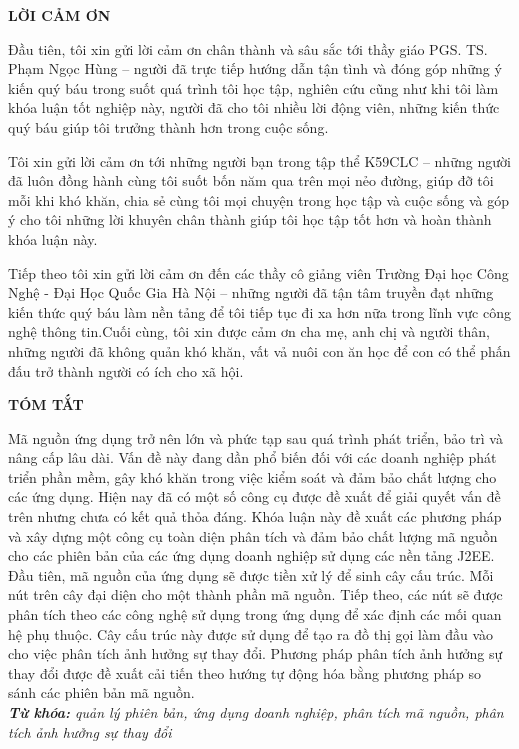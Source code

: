 \documentclass[12pt]{report}
\begin{document}
\newpage
\begin{titlepage}
\begin{center}
	\textbf{\large LỜI CẢM ƠN}
\end{center}
Đầu tiên, tôi xin gửi lời cảm ơn chân thành và sâu sắc tới thầy giáo PGS. TS. Phạm Ngọc Hùng – người đã trực tiếp hướng dẫn tận tình và đóng góp những ý kiến quý báu trong suốt quá trình tôi học tập, nghiên cứu cũng như khi tôi làm khóa luận tốt nghiệp này, người đã cho tôi nhiều lời động viên, những kiến thức quý báu giúp tôi trưởng thành hơn trong cuộc sống.

Tôi xin gửi lời cảm ơn tới những người bạn trong tập thể K59CLC – những người đã luôn đồng hành cùng tôi suốt bốn năm qua trên mọi nẻo đường, giúp đỡ tôi mỗi khi khó khăn, chia sẻ cùng tôi mọi chuyện trong học tập và cuộc sống và góp ý cho tôi những lời khuyên chân thành giúp tôi học tập tốt hơn và hoàn thành khóa luận này.

Tiếp theo tôi xin gửi lời cảm ơn đến các thầy cô giảng viên Trường Đại học Công Nghệ - Đại Học Quốc Gia Hà Nội – những người đã tận tâm truyền đạt những kiến thức quý báu làm nền tảng để tôi tiếp tục đi xa hơn nữa trong lĩnh vực công nghệ thông tin.Cuối cùng, tôi xin được cảm ơn cha mẹ, anh chị và người thân, những người đã không quản khó khăn, vất vả nuôi con ăn học để con có thể phấn đấu trở thành người có ích cho xã hội.
\end{titlepage}

	
\newpage
\begin{titlepage}
\begin{center}
	\textbf{\large TÓM TẮT}
\end{center}
Mã nguồn ứng dụng trở nên lớn và phức tạp sau quá trình phát triển, bảo trì và nâng cấp lâu dài. Vấn đề này đang dần phổ biến đối với các doanh nghiệp phát triển phần mềm, gây khó khăn trong việc kiểm soát và đảm bảo chất lượng cho các ứng dụng. Hiện nay đã có một số công cụ được đề xuất để giải quyết vấn đề trên nhưng chưa có kết quả thỏa đáng. Khóa luận này đề xuất các phương pháp và xây dựng một công cụ toàn diện phân tích và đảm bảo chất lượng mã nguồn cho các phiên bản của các ứng dụng doanh nghiệp sử dụng các nền tảng J2EE. Đầu tiên, mã nguồn của ứng dụng sẽ được tiền xử lý để sinh cây cấu trúc. Mỗi nút trên cây đại diện cho một thành phần mã nguồn. Tiếp theo, các nút sẽ được phân tích theo các công nghệ sử dụng trong ứng dụng để xác định các mối quan hệ phụ thuộc. Cây cấu trúc này được sử dụng để tạo ra đồ thị gọi làm đầu vào cho việc phân tích ảnh hưởng sự thay đổi. Phương pháp phân tích ảnh hưởng sự thay đổi được đề xuất cải tiến theo hướng tự động hóa bằng phương pháp so sánh các phiên bản mã nguồn.\\

\noindent \textit{\textbf{Từ khóa:} quản lý phiên bản, ứng dụng doanh nghiệp, phân tích mã nguồn, phân tích ảnh hưởng sự thay đổi}
\end{titlepage}
\end{document}
